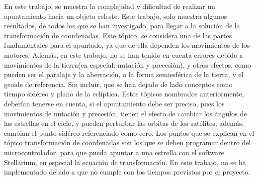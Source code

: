 En este trabajo, se muestra la complejidad y dificultad de realizar un apuntamiento hacia un objeto celeste. Este trabajo, solo muestra algunos resultados, de todos los que se han investigado, para llegar a la solución de la transformación de coordenadas. Este tópico, se considera una de las partes fundamentales para el apuntado, ya que de ella dependen los movimientos de los motores. Además, en este trabajo, no se han tenido en cuenta errores debido a movimientos de la tierra(en especial: nutación y precesión), y otros efectos, como pueden ser el paralaje y la aberración, o la forma semiesférica de la tierra, y el geoide de referencia. Sin incluir, que se han dejado de lado conceptos como tiempo sidéreo y plano de la eclíptica. Estos tópicos nombrados anteriormente, deberían tenerse en cuenta, si el apuntamiento debe ser preciso, pues los movimientos de nutación y precesión, tienen el efecto de cambiar los ángulos de las estrellas en el cielo, y pueden perturbar las orbitas de los satélites, además, cambian el punto sidéreo referenciado como cero.
Los puntos que se explican en el tópico transformación de coordenadas son los que se deben programar dentro del microcontrolador, para que pueda apuntar a una estrella con el software Stellarium, en especial la ecuación de transformación. En este trabajo, no se ha implementado debido a que no cumple con los tiempos previstos por el proyecto. 


